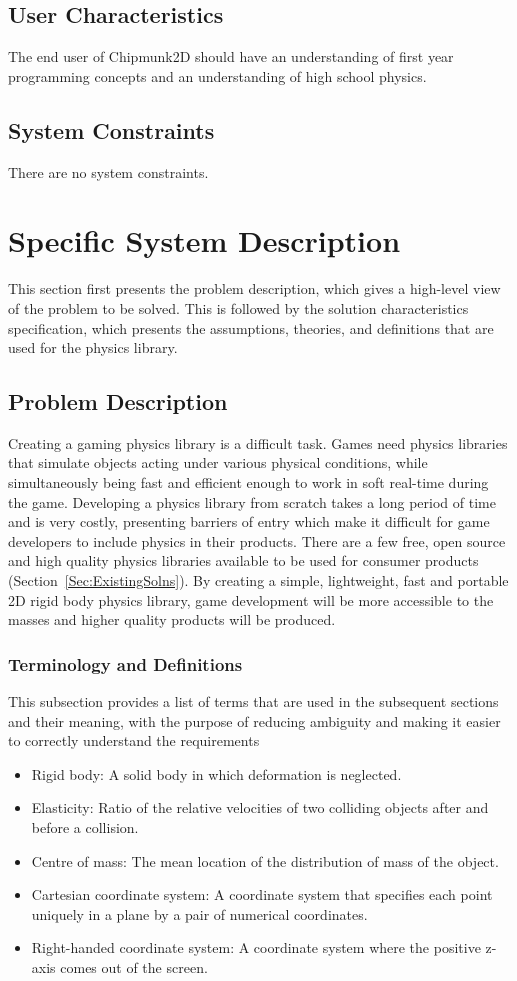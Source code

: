 \documentclass[12pt]{article}
\begin{document}
\subsection{User Characteristics}
\label{Sec:usercharacteristic}
The end user of Chipmunk2D should have an understanding of first year programming concepts and an understanding of high school physics.
\subsection{System Constraints}
\label{Sec:SysConstraints}
There are no system constraints.
\section{Specific System Description}
\label{Sec:SpecSystDesc}
This section first presents the problem description, which gives a high-level view of the problem to be solved. This is followed by the solution characteristics specification, which presents the assumptions, theories, and definitions that are used for the physics library.
\subsection{Problem Description}
\label{Sec:ProbDesc}
Creating a gaming physics library is a difficult task. Games need physics libraries that simulate objects acting under various physical conditions, while simultaneously being fast and efficient enough to work in soft real-time during the game. Developing a physics library from scratch takes a long period of time and is very costly, presenting barriers of entry which make it difficult for game developers to include physics in their products. There are a few free, open source and high quality physics libraries available to be used for consumer products (Section~\ref{Sec:ExistingSolns}). By creating a simple, lightweight, fast and portable 2D rigid body physics library, game development will be more accessible to the masses and higher quality products will be produced.
\subsubsection{Terminology and Definitions}
\label{Sec:TermDefs}
This subsection provides a list of terms that are used in the subsequent sections and their meaning, with the purpose of reducing ambiguity and making it easier to correctly understand the requirements
\begin{itemize}
\item{Rigid body: A solid body in which deformation is neglected.}
\item{Elasticity: Ratio of the relative velocities of two colliding objects after and before a collision.}
\item{Centre of mass: The mean location of the distribution of mass of the object.}
\item{Cartesian coordinate system: A coordinate system that specifies each point uniquely in a plane by a pair of numerical coordinates.}
\item{Right-handed coordinate system: A coordinate system where the positive z-axis comes out of the screen.}
\end{itemize}
\end{document}
